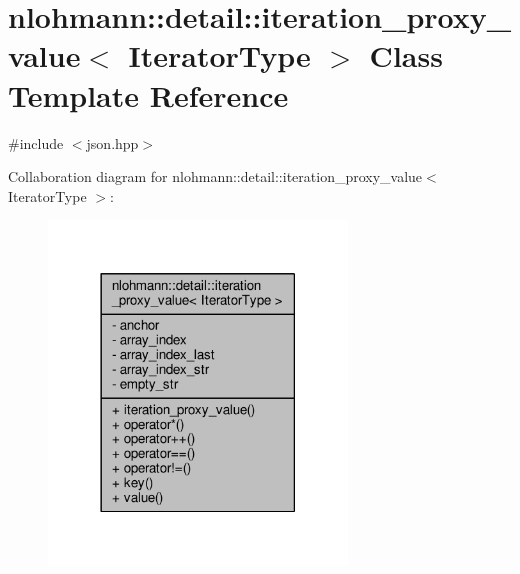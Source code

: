 \hypertarget{classnlohmann_1_1detail_1_1iteration__proxy__value}{}\section{nlohmann\+:\+:detail\+:\+:iteration\+\_\+proxy\+\_\+value$<$ Iterator\+Type $>$ Class Template Reference}
\label{classnlohmann_1_1detail_1_1iteration__proxy__value}


{\ttfamily \#include $<$json.\+hpp$>$}



Collaboration diagram for nlohmann\+:\+:detail\+:\+:iteration\+\_\+proxy\+\_\+value$<$ Iterator\+Type $>$\+:
\nopagebreak
\begin{figure}[H]
\begin{center}
\leavevmode
\includegraphics[width=225pt]{classnlohmann_1_1detail_1_1iteration__proxy__value__coll__graph}
\end{center}
\end{figure}
